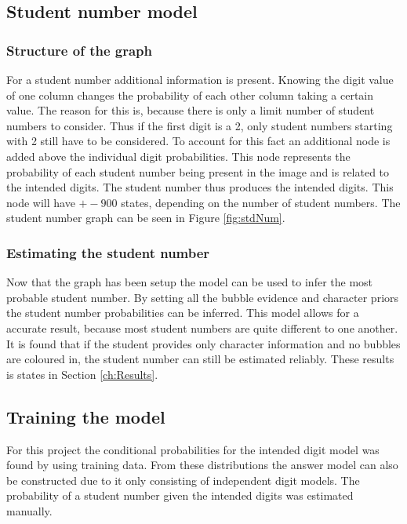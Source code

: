 \subsection{Student number model}
\label{sec:pgmStudentNum}

\subsubsection{Structure of the graph}

For a student number additional information is present. Knowing the digit value of one column changes the probability of each other column taking a certain value. The reason for this is, because there is only a limit number of student numbers to consider. Thus if the first digit is a 2, only student numbers starting with 2 still have to be considered. To account for this fact an additional node is added above the individual digit probabilities. This node represents the probability of each student number being present in the image and is related to the intended digits. The student number thus produces the intended digits. This node will have $+- 900$ states, depending on the number of student numbers. The student number graph can be seen in Figure \ref{fig:stdNum}.

\subsubsection{Estimating the student number}

Now that the graph has been setup the model can be used to infer the most probable student number. By setting all the bubble evidence and character priors the student number probabilities can be inferred. This model allows for a accurate result, because most student numbers are quite different to one another. It is found that if the student provides only character information and no bubbles are coloured in, the student number can still be estimated reliably. These results is states in Section \ref{ch:Results}.

\subsection{Training the model}

For this project the conditional probabilities for the intended digit model was found by using training data. From these distributions the answer model can also be constructed due to it only consisting of independent digit models. The probability of a student number given the intended digits was estimated manually.

